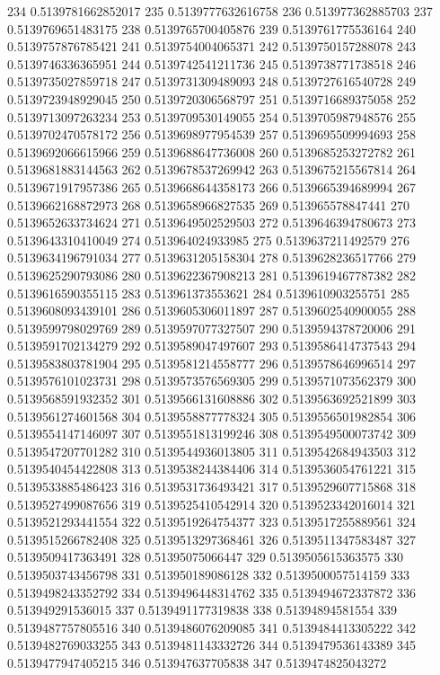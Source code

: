 234 0.5139781662852017
235 0.5139777632616758
236 0.513977362885703
237 0.5139769651483175
238 0.5139765700405876
239 0.5139761775536164
240 0.5139757876785421
241 0.5139754004065371
242 0.5139750157288078
243 0.5139746336365951
244 0.5139742541211736
245 0.5139738771738518
246 0.5139735027859718
247 0.5139731309489093
248 0.5139727616540728
249 0.5139723948929045
250 0.5139720306568797
251 0.5139716689375058
252 0.5139713097263234
253 0.5139709530149055
254 0.5139705987948576
255 0.5139702470578172
256 0.5139698977954539
257 0.5139695509994693
258 0.5139692066615966
259 0.5139688647736008
260 0.5139685253272782
261 0.5139681883144563
262 0.5139678537269942
263 0.5139675215567814
264 0.5139671917957386
265 0.5139668644358173
266 0.5139665394689994
267 0.5139662168872973
268 0.5139658966827535
269 0.513965578847441
270 0.5139652633734624
271 0.5139649502529503
272 0.5139646394780673
273 0.5139643310410049
274 0.513964024933985
275 0.5139637211492579
276 0.5139634196791034
277 0.5139631205158304
278 0.5139628236517766
279 0.5139625290793086
280 0.5139622367908213
281 0.5139619467787382
282 0.5139616590355115
283 0.513961373553621
284 0.5139610903255751
285 0.5139608093439101
286 0.5139605306011897
287 0.5139602540900055
288 0.5139599798029769
289 0.5139597077327507
290 0.5139594378720006
291 0.5139591702134279
292 0.5139589047497607
293 0.5139586414737543
294 0.5139583803781904
295 0.5139581214558777
296 0.5139578646996514
297 0.5139576101023731
298 0.5139573576569305
299 0.5139571073562379
300 0.5139568591932352
301 0.5139566131608886
302 0.5139563692521899
303 0.5139561274601568
304 0.5139558877778324
305 0.5139556501982854
306 0.5139554147146097
307 0.5139551813199246
308 0.5139549500073742
309 0.5139547207701282
310 0.5139544936013805
311 0.5139542684943503
312 0.5139540454422808
313 0.5139538244384406
314 0.5139536054761221
315 0.5139533885486423
316 0.5139531736493421
317 0.5139529607715868
318 0.5139527499087656
319 0.5139525410542914
320 0.5139523342016014
321 0.5139521293441554
322 0.5139519264754377
323 0.5139517255889561
324 0.5139515266782408
325 0.5139513297368461
326 0.5139511347583487
327 0.5139509417363491
328 0.51395075066447
329 0.5139505615363575
330 0.5139503743456798
331 0.513950189086128
332 0.5139500057514159
333 0.5139498243352792
334 0.5139496448314762
335 0.5139494672337872
336 0.513949291536015
337 0.5139491177319838
338 0.51394894581554
339 0.5139487757805516
340 0.5139486076209085
341 0.5139484413305222
342 0.5139482769033255
343 0.5139481143332726
344 0.5139479536143389
345 0.5139477947405215
346 0.513947637705838
347 0.5139474825043272
